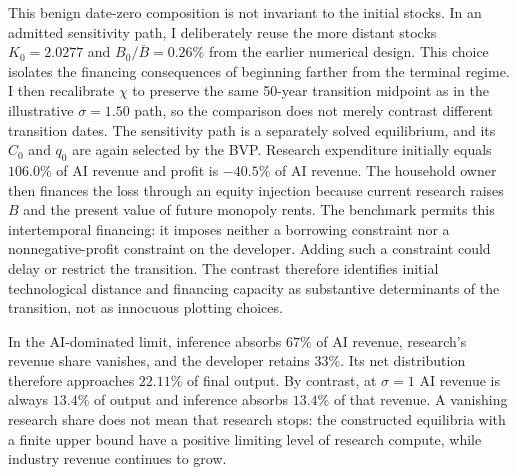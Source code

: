 This benign date-zero composition is not invariant to the initial stocks. In
an admitted sensitivity path, I deliberately reuse the more distant stocks
$K_0=2.0277$ and $B_0/\overline B=0.26\%$ from the earlier numerical design.
This choice isolates the financing consequences of beginning farther from the
terminal regime. I then recalibrate $\chi$ to preserve the same 50-year
transition midpoint as in the illustrative $\sigma=1.50$ path, so the comparison does
not merely contrast different transition dates. The sensitivity path is a
separately solved equilibrium, and its $C_0$ and $q_0$ are again selected by
the BVP. Research expenditure initially equals $106.0\%$ of
AI revenue and profit is $-40.5\%$ of AI revenue. The household owner then
finances the loss through an equity injection because current research raises
$B$ and the present value of future monopoly rents. The benchmark permits this intertemporal
financing: it imposes neither a borrowing constraint nor a nonnegative-profit
constraint on the developer. Adding such a constraint could delay or restrict
the transition. The contrast therefore identifies initial technological
distance and financing capacity as substantive determinants of the transition,
not as innocuous plotting choices.

In the AI-dominated limit, inference absorbs $67\%$ of AI revenue, research's
revenue share vanishes, and the developer retains $33\%$. Its net distribution
therefore approaches $22.11\%$ of final output. By contrast, at $\sigma=1$
AI revenue is always $13.4\%$ of output and inference absorbs $13.4\%$ of
that revenue. A vanishing research share does not mean that research stops:
the constructed equilibria with a finite upper bound have a positive limiting level of
research compute, while industry revenue continues to grow.
